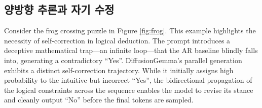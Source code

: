 \documentclass[11pt, a4paper, logo, copyright, gdm]{google}
\begin{document}
\subsection{양방향 추론과 자기 수정}\label{app:advantages_bidir}

Consider the frog crossing puzzle in Figure \ref{fig:frog}. This example highlights the necessity of self-correction in logical deduction. The prompt introduces a deceptive mathematical trap---an infinite loop---that the AR baseline blindly falls into, generating a contradictory ``Yes''. DiffusionGemma's parallel generation exhibits a distinct self-correction trajectory. While it initially assigns high probability to the intuitive but incorrect ``Yes'', the bidirectional propagation of the logical constraints across the sequence enables the model to revise its stance and cleanly output ``No'' before the final tokens are sampled.
\end{document}
